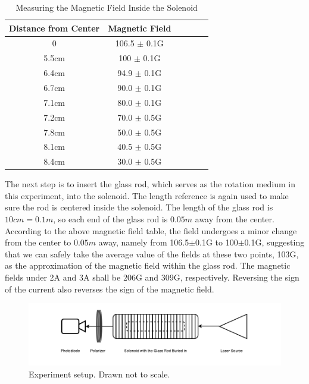\documentclass[prb,preprint]{revtex4-1}
\begin{document}
\begin{table}[H]
\centering
\caption{Measuring the Magnetic Field Inside the Solenoid}
\begin{ruledtabular}
\begin{tabular}{c c c c c c}
Distance from Center & Magnetic Field\\
\hline
0                    & 106.5 $\pm$ 0.1G \\ 
5.5cm                & 100 $\pm$ 0.1G   \\ 
6.4cm                & 94.9 $\pm$ 0.1G  \\ 
6.7cm                & 90.0 $\pm$ 0.1G  \\ 
7.1cm                & 80.0 $\pm$ 0.1G  \\ 
7.2cm                & 70.0 $\pm$ 0.5G  \\ 
7.8cm                & 50.0 $\pm$ 0.5G  \\ 
8.1cm                & 40.5 $\pm$ 0.5G  \\ 
8.4cm                & 30.0 $\pm$ 0.5G  \\ 

\end{tabular}
\end{ruledtabular}
\label{AnglevsB}
\end{table}

The next step is to insert the glass rod, which serves as the rotation medium in this experiment, into the solenoid. The length reference is again used to make sure the rod is centered inside the solenoid. The length of the glass rod is $10cm=0.1m$, so each end of the glass rod is $0.05m$ away from the center. According to the above magnetic field table, the field undergoes a minor change from the center to $0.05m$ away, namely from 106.5$\pm$0.1G to 100$\pm$0.1G, suggesting that we can safely take the average value of the fields at these two points, 103G, as the approximation of the magnetic field within the glass rod. The magnetic fields under 2A and 3A shall be 206G and 309G, respectively. Reversing the sign of the current also reverses the sign of the magnetic field.

\begin{figure}[H]
    \centering
    \includegraphics[width=180mm]{ExperimentSetup.pdf}
    \caption{Experiment setup. Drawn not to scale. }
    \end{figure}
    
\end{document}
